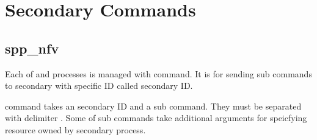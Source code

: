 \documentclass[a4paper,11pt,openany,oneside,english]{sphinxmanual}
\begin{document}
\begin{sphinxVerbatim}[commandchars=\\\{\},formatcom=\footnotesize]
\end{sphinxVerbatim}


\section{Secondary Commands}
\label{\detokenize{commands/secondary/index:secondary-commands}}\label{\detokenize{commands/secondary/index::doc}}

\subsection{spp\_nfv}
\label{\detokenize{commands/secondary/spp_nfv:spp-nfv}}\label{\detokenize{commands/secondary/spp_nfv:commands-spp-nfv}}\label{\detokenize{commands/secondary/spp_nfv::doc}}
Each of  and  processes is managed with  command.
It is for sending sub commands to secondary with specific ID called
secondary ID.

 command takes an secondary ID and a sub command. They must be
separated with delimiter \sphinxcode{\sphinxupquote{;}}.
Some of sub commands take additional arguments for speicfying resource
owned by secondary process.

\begin{sphinxVerbatim}[commandchars=\\\{\},formatcom=\footnotesize]
\end{sphinxVerbatim}
\end{document}
